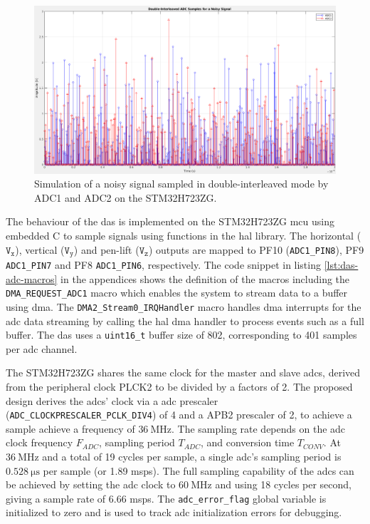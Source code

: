 \documentclass[class=report,11pt,crop=false]{standalone}
\begin{document}
	\begin{figure}[h!]
		\centering
		\includegraphics[width=0.70\linewidth]{Figures/Methodology/das-adc-sim-noisy}
		\caption{Simulation of a noisy signal sampled in double-interleaved mode by ADC1 and ADC2 on the STM32H723ZG.}
		\label{fig:das-adc-sim-noisy}
	\end{figure} 

	The behaviour of the \acrshort{das} is implemented on the STM32H723ZG \acrshort{mcu} using embedded C to sample signals using functions in the \acrfull{hal} library. The horizontal ($\texttt{V}_\texttt{x}$), vertical ($\texttt{V}_\texttt{y}$) and pen-lift ($\texttt{V}_\texttt{z}$) outputs are mapped to PF10 (\texttt{ADC1\_PIN8}), PF9 \texttt{ADC1\_PIN7} and PF8 \texttt{ADC1\_PIN6}, respectively. The code snippet in listing \ref{lst:das-adc-macros} in the appendices shows the definition of the macros including the \texttt{DMA\_REQUEST\_ADC1} macro which enables the system to stream data to a buffer using \acrshort{dma}. The \texttt{DMA2\_Stream0\_IRQHandler} macro handles \acrshort{dma} interrupts for the \acrshort{adc} data streaming by calling the \acrshort{hal} \acrshort{dma} handler to process events such as a full buffer. The \acrshort{das} uses a \texttt{uint16\_t} buffer size of 802, corresponding to 401 samples per \acrshort{adc} channel. 
	
	The STM32H723ZG shares the same clock for the master and slave \acrshort{adc}s, derived from the peripheral clock PLCK2 to be divided by a factors of 2. The proposed design derives the \acrshort{adc}s' clock via a \acrshort{adc} prescaler (\texttt{ADC\_CLOCKPRESCALER\_PCLK\_DIV4}) of 4 and a APB2 prescaler of 2, to achieve a sample achieve a frequency of $\SI{36}{\mega\hertz}$. The sampling rate depends on the \acrshort{adc} clock frequency $F_{ADC}$, sampling period $T_{ADC}$, and conversion time $T_{CONV}$. At $\SI{36}{\mega\hertz}$ and a total of 19 cycles per sample, a single \acrshort{adc}'s sampling period is $\SI{0.528}{\micro\second}$ per sample (or 1.89 \acrshort{msps}). The full sampling capability of the \acrshort{adc}s can be achieved by setting the \acrshort{adc} clock to $\SI{60}{\mega\hertz}$ and using 18 cycles per second, giving a sample rate of 6.66 \acrshort{msps}. The \texttt{adc\_error\_flag} global variable is initialized to zero and is used to track \acrshort{adc} initialization errors for debugging. 
	
\end{document}
